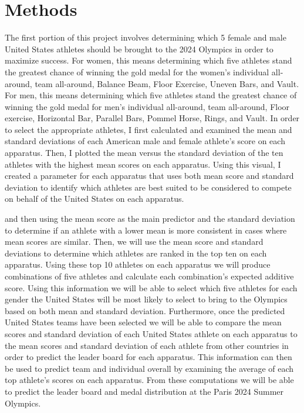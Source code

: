 \documentclass[12pt]{article}
\begin{document}
\section{Methods}
\label{sec:meth}

The first portion of this project involves determining which 5 female and male United States athletes
should be brought to the 2024 Olympics in order to maximize success. For women, this means determining 
which five athletes stand the greatest chance of winning the gold medal for the women's individual all-around,
team all-around, Balance Beam, Floor Exercise, Uneven Bars, and Vault. For men, this means determining
which five athletes stand the greatest chance of winning the gold medal for men's individual all-around, team 
all-around, Floor exercise, Horizontal Bar, Parallel Bars, Pommel Horse, Rings, and Vault. In order 
to select the appropriate athletes, I first calculated and examined the mean and standard 
deviations of each American male and female athlete's score on each apparatus. Then, I plotted the mean 
versus the standard deviation of the ten athletes with the highest mean scores on each apparatus. 
Using this visual, I created a parameter for each apparatus that uses both mean score and standard 
deviation to identify which athletes are best suited to be considered to compete on behalf of the United 
States on each apparatus.


and then using the 
mean score as the main predictor and the standard deviation to determine if an athlete with a lower 
mean is more consistent in cases where mean scores are similar. Then, we will use the mean score and 
standard deviations to determine which athletes are ranked in the top ten on each apparatus. Using 
these top 10 athletes on each apparatus we will produce combinations of five athletes and calculate 
each combination's expected additive score. Using this information we will be able to select which 
five athletes for each gender the United States will be most likely to select to bring to the Olympics 
based on both mean and standard deviation. Furthermore, once the predicted United States teams have 
been selected we will be able to compare the mean scores and standard deviation of each United States 
athlete on each apparatus to the mean scores and standard deviation of each athlete from other countries 
in order to predict the leader board for each apparatus. This information can then be used to predict 
team and individual overall by examining the average of each top athlete's scores on each apparatus. 
From these computations we will be able to predict the leader board and medal distribution at the Paris 
2024 Summer Olympics.
\end{document}
